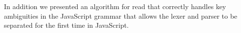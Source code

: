 \documentclass[preprint,10pt]{sigplanconf}
\begin{document}
In addition we presented an algorithm for read that correctly handles key ambiguities in the JavaScript grammar that allows the lexer and parser to be separated for the first time in JavaScript.










\end{document}
